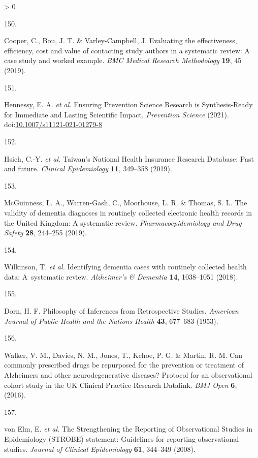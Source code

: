 \documentclass[a4paper, twoside]{templates/ociamthesis}
\newlength{\cslhangindent}
\newlength{\csllabelwidth}
\newenvironment{CSLReferences}[3] %
 {%
  \setlength{\parindent}{0pt}
  \ifodd #1 \everypar{\setlength{\hangindent}{\cslhangindent}}\ignorespaces\fi
  \ifnum #2 > 0
  \setlength{\parskip}{#2\baselineskip}
  \fi
 }%
 {}
\newcommand{\CSLLeftMargin}[1]{\parbox[t]{\maxof{\widthof{#1}}{\csllabelwidth}}{#1}}
\newcommand{\CSLRightInline}[1]{\parbox[t]{\linewidth - \csllabelwidth}{#1}}
\begin{document}
\begin{CSLReferences}{0}{0}
\leavevmode\hypertarget{ref-cooper2019}{}%
\CSLLeftMargin{150. }
\CSLRightInline{Cooper, C., Bou, J. T. \& Varley-Campbell, J. Evaluating the effectiveness, efficiency, cost and value of contacting study authors in a systematic review: A case study and worked example. \emph{BMC Medical Research Methodology} \textbf{19}, 45 (2019).}

\leavevmode\hypertarget{ref-hennessy2021}{}%
\CSLLeftMargin{151. }
\CSLRightInline{Hennessy, E. A. \emph{et al.} Ensuring {Prevention Science Research} is {Synthesis}-{Ready} for {Immediate} and {Lasting Scientific Impact}. \emph{Prevention Science} (2021). doi:\href{https://doi.org/10.1007/s11121-021-01279-8}{10.1007/s11121-021-01279-8}}

\leavevmode\hypertarget{ref-hsieh2019}{}%
\CSLLeftMargin{152. }
\CSLRightInline{Hsieh, C.-Y. \emph{et al.} Taiwan's {National Health Insurance Research Database}: Past and future. \emph{Clinical Epidemiology} \textbf{11}, 349--358 (2019).}

\leavevmode\hypertarget{ref-mcguinness2019validity}{}%
\CSLLeftMargin{153. }
\CSLRightInline{McGuinness, L. A., Warren-Gash, C., Moorhouse, L. R. \& Thomas, S. L. The validity of dementia diagnoses in routinely collected electronic health records in the {United Kingdom}: {A} systematic review. \emph{Pharmacoepidemiology and Drug Safety} \textbf{28}, 244--255 (2019).}

\leavevmode\hypertarget{ref-wilkinson2018}{}%
\CSLLeftMargin{154. }
\CSLRightInline{Wilkinson, T. \emph{et al.} Identifying dementia cases with routinely collected health data: {A}~systematic review. \emph{Alzheimer's \& Dementia} \textbf{14}, 1038--1051 (2018).}

\leavevmode\hypertarget{ref-dorn1953}{}%
\CSLLeftMargin{155. }
\CSLRightInline{Dorn, H. F. Philosophy of {Inferences} from {Retrospective Studies}. \emph{American Journal of Public Health and the Nations Health} \textbf{43}, 677--683 (1953).}

\leavevmode\hypertarget{ref-walker2016}{}%
\CSLLeftMargin{156. }
\CSLRightInline{Walker, V. M., Davies, N. M., Jones, T., Kehoe, P. G. \& Martin, R. M. Can commonly prescribed drugs be repurposed for the prevention or treatment of {Alzheimers} and other neurodegenerative diseases? {Protocol} for an observational cohort study in the {UK Clinical Practice Research Datalink}. \emph{BMJ Open} \textbf{6}, (2016).}

\leavevmode\hypertarget{ref-vonelm2008}{}%
\CSLLeftMargin{157. }
\CSLRightInline{von Elm, E. \emph{et al.} The {Strengthening} the {Reporting} of {Observational Studies} in {Epidemiology} ({STROBE}) statement: Guidelines for reporting observational studies. \emph{Journal of Clinical Epidemiology} \textbf{61}, 344--349 (2008).}


\end{CSLReferences}
\end{document}
